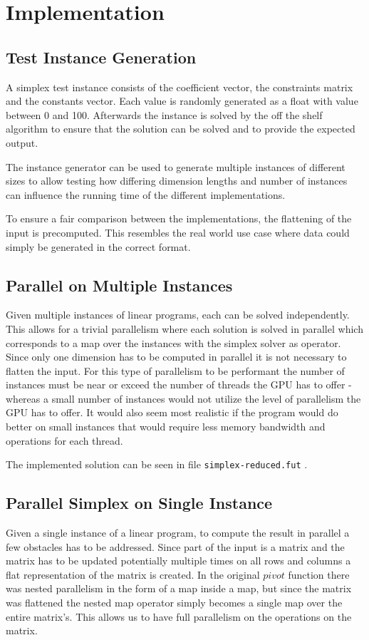 \section{Implementation}
\subsection{Test Instance Generation}
A simplex test instance consists of the coefficient vector, the constraints matrix and the constants vector. Each value is randomly generated as a float with value between 0 and 100. Afterwards the instance is solved by the off the shelf algorithm to ensure that the solution can be solved and to provide the expected output. 

The instance generator can be used to generate multiple instances of different sizes to allow testing how differing dimension lengths and number of instances can influence the running time of the different implementations.

To ensure a fair comparison between the implementations, the flattening of the input is precomputed. This resembles the real world use case where data could simply be generated in the correct format. 

\subsection{Parallel on Multiple Instances}
Given multiple instances of linear programs, each can be solved independently. This allows for a trivial parallelism where each solution is solved in parallel which corresponds to a map over the instances with the simplex solver as operator. Since only one dimension has to be computed in parallel it is not necessary to flatten the input. For this type of parallelism to be performant the number of instances must be near or exceed the number of threads the GPU has to offer - whereas a small number of instances would not utilize the level of parallelism the GPU has to offer. It would also seem most realistic if the program would do better on small instances that would require less memory bandwidth and operations for each thread.

The implemented solution can be seen in file \texttt{simplex-reduced.fut} .

\subsection{Parallel Simplex on Single Instance}
Given a single instance of a linear program, to compute the result in parallel a few obstacles has to be addressed. Since part of the input is a matrix and the matrix has to be updated potentially multiple times on all rows and columns a flat representation of the matrix is created. In the original $pivot$ function there was nested parallelism in the form of a map inside a map, but since the matrix was flattened the nested map operator simply becomes a single map over the entire matrix's. This allows us to have full parallelism on the operations on the matrix. 


